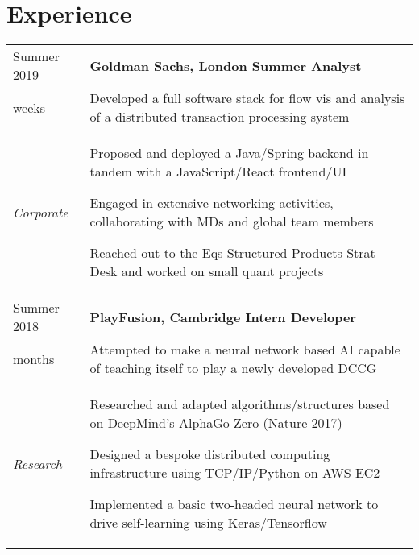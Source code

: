 \documentclass[letterpaper, 10pt]{article}
\begin{document}

\section*{Experience}
\begin{tabularx}{\linewidth}{>{\raggedleft}p{2.2cm}|X}
Summer 2019 & \textbf{Goldman Sachs, London \hfill Summer Analyst}\\
10 weeks & Developed a full software stack for flow vis and analysis of a distributed transaction processing system\\
\textit{Corporate} &
\vspace{-.5\baselineskip}
\begin{compact}
	\item Proposed and deployed a Java/Spring backend in tandem with a JavaScript/React frontend/UI
	\item Engaged in extensive networking activities, collaborating with MDs and global team members
	\item Reached out to the Eqs Structured Products Strat Desk and worked on small quant projects
	\vspace{-.5\baselineskip}
\end{compact}\\
Summer 2018 & \textbf{PlayFusion, Cambridge \hfill Intern Developer}\\
3 months & Attempted to make a neural network based AI capable of teaching itself to play a newly developed DCCG\\
\textit{Research} &
\vspace{-.5\baselineskip}
\begin{compact}
	\item Researched and adapted algorithms/structures based on DeepMind's AlphaGo Zero (Nature 2017)
	\item Designed a bespoke distributed computing infrastructure using TCP/IP/Python on AWS EC2
	\item Implemented a basic two-headed neural network to drive self-learning using Keras/Tensorflow

\end{compact}
\end{tabularx}
\end{document}
